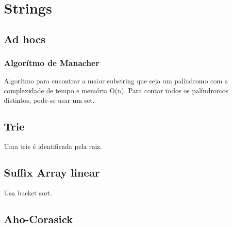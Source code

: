 \section{Strings}

\subsection{Ad hocs}
\subsubsection{Algorítmo de Manacher}
Algor\'{i}tmo para encontrar a maior substring que seja um pal\'{i}ndromo com a complexidade de tempo e mem\'{o}ria O(n).
Para contar todos os palíndromos distintos, pode-se usar um set.

\divisor
\subsection{Trie}
Uma trie \'{e} identificada pela raiz.

\divisor

\subsection{Suffix Array linear}

Usa bucket sort.


\divisor

\subsection{Aho-Corasick}
